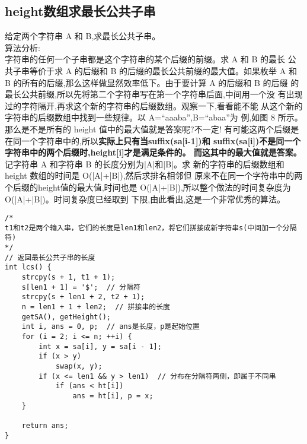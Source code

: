     \subsection{height数组求最长公共子串}
        给定两个字符串 A 和 B,求最长公共子串。\\
        算法分析:\\
        字符串的任何一个子串都是这个字符串的某个后缀的前缀。求 A 和 B 的最长
        公共子串等价于求 A 的后缀和 B 的后缀的最长公共前缀的最大值。如果枚举 A
        和 B 的所有的后缀,那么这样做显然效率低下。由于要计算 A 的后缀和 B 的后缀
        的最长公共前缀,所以先将第二个字符串写在第一个字符串后面,中间用一个没
        有出现过的字符隔开,再求这个新的字符串的后缀数组。观察一下,看看能不能
        从这个新的字符串的后缀数组中找到一些规律。以 A=“aaaba”,B=“abaa”为
        例,如图 8 所示。那么是不是所有的 height 值中的最大值就是答案呢?不一定!
        有可能这两个后缀是在同一个字符串中的,所以\textbf{实际上只有当suffix(sa[i-1])和
        suffix(sa[i])不是同一个字符串中的两个后缀时,height[i]才是满足条件的。
        而这其中的最大值就是答案。}记字符串 A 和字符串 B 的长度分别为|A|和|B|。求
        新的字符串的后缀数组和 height 数组的时间是 O(|A|+|B|),然后求排名相邻但
        原来不在同一个字符串中的两个后缀的height值的最大值,时间也是
        O(|A|+|B|),所以整个做法的时间复杂度为 O(|A|+|B|)。时间复杂度已经取到
        下限,由此看出,这是一个非常优秀的算法。
\begin{lstlisting}
/*
t1和t2是两个输入串，它们的长度是len1和len2，将它们拼接成新字符串s(中间加一个分隔符)
*/
// 返回最长公共子串的长度
int lcs() {
    strcpy(s + 1, t1 + 1);
    s[len1 + 1] = '$';  // 分隔符
    strcpy(s + len1 + 2, t2 + 1);
    n = len1 + 1 + len2;  // 拼接串的长度
    getSA(), getHeight();
    int i, ans = 0, p;  // ans是长度，p是起始位置
    for (i = 2; i <= n; ++i) {
        int x = sa[i], y = sa[i - 1];
        if (x > y)
            swap(x, y);
        if (x <= len1 && y > len1)  // 分布在分隔符两侧，即属于不同串
            if (ans < ht[i])
                ans = ht[i], p = x;
    }

    return ans;
}
\end{lstlisting}
